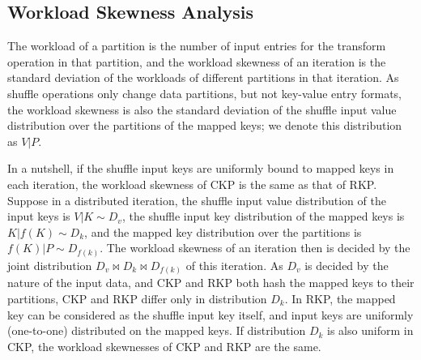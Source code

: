 \documentclass[10pt,journal,compsoc]{IEEEtran}
\begin{document}
\subsection{Workload Skewness Analysis}\label{section:skew}
The workload of a partition is the number of input entries for the
transform operation in that partition, and
the workload skewness of an iteration is the standard deviation of the
workloads of different partitions in that iteration. As shuffle
operations only change data partitions, but not key-value
entry formats, the workload skewness is also the standard deviation of
the shuffle input value distribution over the partitions of the
mapped keys; we denote this distribution as $V|P$.



In a nutshell, if the shuffle input keys are uniformly bound to mapped keys
in each iteration, the workload skewness of CKP is the same as that of
RKP. Suppose in a distributed iteration, the shuffle input value
distribution of the input keys is $V|K \sim D_v$, the shuffle input key
distribution of the mapped keys is $K|f(K) \sim D_k$, and the mapped
key distribution over the partitions is $f(K)|P \sim D_{f(k)}$.
The workload skewness of an iteration then is decided by the joint
distribution $D_v \bowtie D_k \bowtie D_{f(k)}$ of this iteration. As
$D_v$ is decided by the nature of the input data, and CKP and RKP both
hash the mapped keys to their partitions, CKP and RKP differ only in
distribution $D_k$. In RKP, the mapped key can be considered as the
shuffle input key itself, and input keys are uniformly (one-to-one)
distributed on the mapped keys. If distribution $D_k$ is also uniform in
CKP, the workload skewnesses of CKP and RKP are the same.




\end{document}
